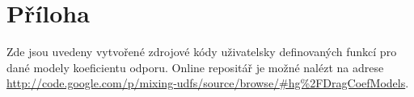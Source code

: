 \chapter*{Příloha}
\label{sec:priloha}
Zde jsou uvedeny vytvořené zdrojové kódy uživatelsky definovaných funkcí pro dané modely koeficientu odporu. Online repositář je možné nalézt na adrese \href{http://code.google.com/p/mixing-udfs/source/browse/\#hg\%2FDragCoefModels}{http://code.google.com/p/mixing-udfs/source/browse/\#hg\%2FDragCoefModels}. 





